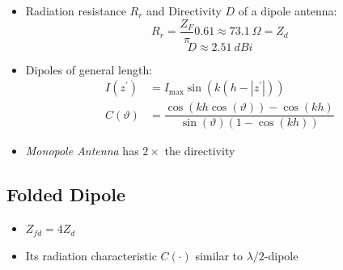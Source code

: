 \begin{itemize}
    \itemsep0pt
    \item Radiation resistance $R_r$ and Directivity $D$ of a dipole antenna:
        \begin{equation*}
            R_r = \dfrac{Z_F}{\pi} 0.61 \approx \SI{73.1}{\Omega} = Z_d
        \end{equation*}
        \begin{equation*}
            D \approx \SI{2.51}{dBi}
        \end{equation*}
    \item Dipoles of general length:
        \begin{align*}
            I(z^\prime) &= I_{\mathrm{max}} \sin\left(k (h - |z^\prime|)\right)\\
            C(\vartheta) &= \dfrac{\cos(k h \cos(\vartheta)) - \cos(k h)}{\sin(\vartheta) (1 - \cos(k h))}
        \end{align*}
    \item \textit{Monopole Antenna} has $2\times$ the directivity
\end{itemize}

\subsection{Folded Dipole}
\begin{itemize}
    \itemsep0pt
    \item \(Z_{fd} = 4 Z_d\)
    \item Its radiation characteristic $C(\cdot)$ similar to $\lambda/2$-dipole
\end{itemize}

